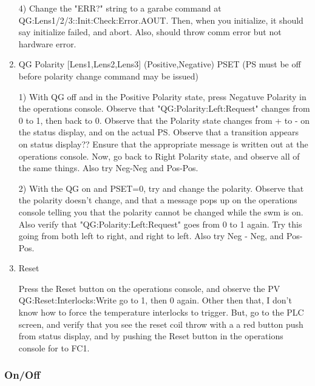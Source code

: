 \documentclass[11pt]{book}		%
\begin{document}
\begin{enumerate}
4) Change the "ERR?" string to a garabe command at QG:Lens1/2/3::Init:Check:Error.AOUT. Then, when you initialize, it should say initialize failed, and abort. Also, should throw comm error but not hardware error.


\color{black}

 \item QG Polarity [Lens1,Lens2,Lens3] (Positive,Negative) PSET (PS must be off before polarity change command may be issued)

\color{red}

1) With QG off and in the Positive Polarity state, press Negatuve Polarity in the operations console. Observe that "QG:Polarity:Left:Request" changes from 0 to 1, then back to 0. Observe that the Polarity state changes from + to - on the status display, and on the actual PS. Observe that a transition appears on status display?? Ensure that the appropriate message is written out at the operations console. Now, go back to Right Polarity state, and observe all of the same things. Also try Neg-Neg and Pos-Pos.

2) With the QG on and PSET=0, try and change the polarity. Observe that the polarity doesn't change, and that a message pops up on the operations console telling you that the polarity cannot be changed while the swm is on. Also verify that "QG:Polarity:Left:Request" goes from 0 to 1 again. Try this going from both left to right, and right to left. Also try Neg - Neg, and Pos- Pos.


\color{black}

 \item Reset

\color{red}

Press the Reset button on the operations console, and observe the PV QG:Reset:Interlocks:Write go to 1, then 0 again. Other then that, I don't know how to force the temperature interlocks to trigger. But, go to the PLC screen, and verify that you see the reset coil throw with a a red button push from status display, and by pushing the Reset button in the operations console for to FC1.

\color{black}

\end{enumerate}

\subsubsection{On/Off} \label{sect:cyc-equip-ctl-beamline-quad1-state-controls-on-off}
\end{document}
